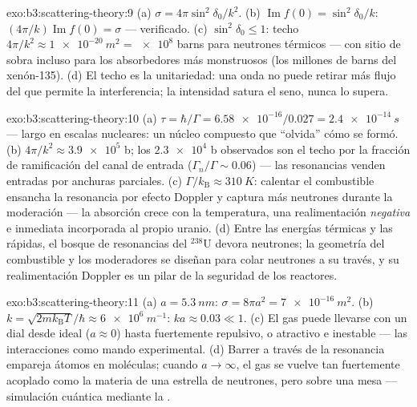 \begin{solution}{exo:b3:scattering-theory:9}
(a) $\sigma = 4\pi\sin^2\delta_0/k^2$. (b) $\operatorname{Im}f(0)
= \sin^2\delta_0/k$: $(4\pi/k)\operatorname{Im}f(0) = \sigma$ ---
verificado. (c) $\sin^2\delta_0 \le 1$: techo $4\pi/k^2 \approx
\qty{1e-20}{m^2} = \num{e8}$ barns para neutrones térmicos ---
con sitio de sobra incluso para los absorbedores más monstruosos (los
millones de barns del xenón-135). (d) El techo es la unitariedad: una onda
no puede retirar más flujo del que permite la interferencia; la intensidad
satura el seno, nunca lo supera.
\end{solution}

\begin{solution}{exo:b3:scattering-theory:10}
(a) $\tau = \hbar/\Gamma = \num{6.58e-16}/0.027 =
\qty{2.4e-14}{s}$ --- largo en escalas nucleares: un núcleo
compuesto que ``olvida'' cómo se formó. (b) $4\pi/k^2 \approx
\num{3.9e5}$ b; los $\num{2.3e4}$ b observados son el techo por
la fracción de ramificación del canal de entrada ($\Gamma_n/\Gamma
\sim 0.06$) --- las resonancias venden entradas por anchuras parciales. (c)
$\Gamma/k_{\text{B}} \approx \qty{310}{K}$: calentar el combustible
ensancha la resonancia por efecto Doppler y captura más neutrones durante
la moderación --- la absorción crece con la temperatura, una realimentación
\emph{negativa} e inmediata incorporada al propio uranio. (d) Entre las
energías térmicas y las rápidas, el bosque de resonancias del $^{238}$U
devora neutrones; la geometría del combustible y los moderadores se diseñan
para colar neutrones a su través, y su realimentación Doppler es un pilar de
la seguridad de los reactores.
\end{solution}

\begin{solution}{exo:b3:scattering-theory:11}
(a) $a = \qty{5.3}{nm}$: $\sigma = 8\pi a^2 = \qty{7e-16}{m^2}$.
(b) $k = \sqrt{2mk_{\text{B}}T}/\hbar \approx \qty{6e6}{m^{-1}}$:
$ka \approx 0.03 \ll 1$. (c) El gas puede llevarse con un dial desde ideal
($a \approx 0$) hasta fuertemente repulsivo, o atractivo e
inestable --- las interacciones como mando experimental. (d) Barrer a
través de la resonancia empareja átomos en moléculas; cuando $a \to
\infty$, el gas se vuelve tan fuertemente acoplado como la materia de una
estrella de neutrones, pero sobre una mesa --- simulación cuántica mediante
la .
\end{solution}

